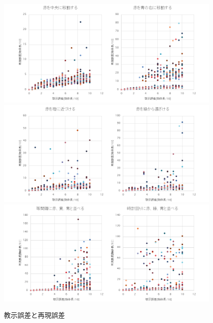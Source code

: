 	\begin{figure}
		\begin{center}
			\includegraphics[width=15.5cm]{chart6.png} \\ %
			\includegraphics[width=15.5cm]{chart7.png} \\ %
			\includegraphics[width=15.5cm]{chart8.png} \\ %
			\caption{教示誤差と再現誤差}
			\label{figure:errors}
		\end{center}
	\end{figure}


